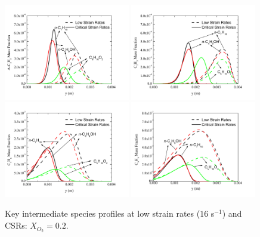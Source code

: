 \begin{figure}[t]
  \centering
  \scriptsize
  \includegraphics[trim=4mm 8mm 30mm 20mm, clip=true, width=0.49\textwidth]{ch-biofuel/A-C3H5-y.png}
  \includegraphics[trim=4mm 8mm 30mm 20mm, clip=true, width=0.49\textwidth]{ch-biofuel/C3H3-y.png}
  \includegraphics[trim=4mm 8mm 30mm 20mm, clip=true, width=0.49\textwidth]{ch-biofuel/C5H6-y.png}
  \includegraphics[trim=4mm 8mm 30mm 20mm, clip=true, width=0.49\textwidth]{ch-biofuel/A1-y.png}
  \normalsize
  \caption{Key intermediate species profiles at low strain rates ($16$ s$^{-1}$) and CSRs: $X_{O_2}=0.2$.}
  \label{fig:CxHy}
\end{figure}

